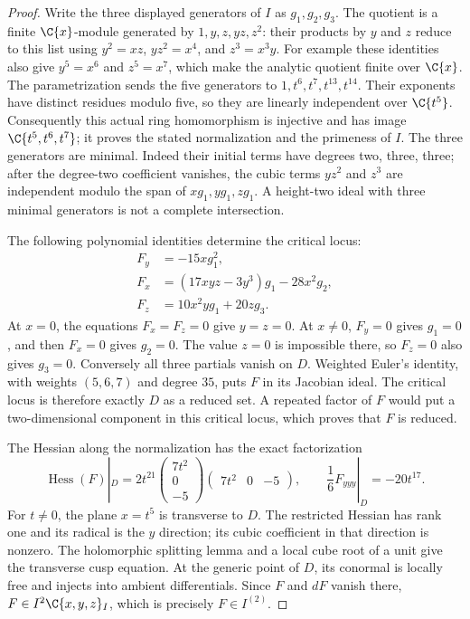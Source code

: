 \begin{proof}
Write the three displayed generators of $I$ as $g_1,g_2,g_3$.
The quotient is a finite $\C\{x\}$-module generated by
$1,y,z,yz,z^2$: their products by $y$ and $z$ reduce to this list
using $y^2=xz$, $yz^2=x^4$, and $z^3=x^3y$.
For example these identities also give $y^5=x^6$ and $z^5=x^7$,
which make the analytic quotient finite over $\C\{x\}$.
The parametrization sends the five generators to
$1,t^6,t^7,t^{13},t^{14}$. Their exponents have distinct residues
modulo five, so they are linearly independent over $\C\{t^5\}$.
Consequently this actual ring homomorphism is injective and has
image $\C\{t^5,t^6,t^7\}$; it proves the stated normalization and
the primeness of $I$. The three generators are minimal. Indeed their
initial terms have degrees two, three, three; after the degree-two
coefficient vanishes, the cubic terms $yz^2$ and $z^3$ are independent
modulo the span of $xg_1,yg_1,zg_1$. A height-two ideal with three
minimal generators is not a complete intersection.

The following polynomial identities determine the critical locus:
\[
 \begin{aligned}
 F_y&=-15xg_1^2,\\
 F_x&=(17xyz-3y^3)g_1-28x^2g_2,\\
 F_z&=10x^2yg_1+20zg_3.
 \end{aligned}                                                   \tag{A.NL.3}
\]
At $x=0$, the equations $F_x=F_z=0$ give $y=z=0$.
At $x\ne0$, $F_y=0$ gives $g_1=0$, and then $F_x=0$
gives $g_2=0$. The value $z=0$ is impossible there, so $F_z=0$
also gives $g_3=0$. Conversely all three partials vanish on $D$.
Weighted Euler's identity, with weights $(5,6,7)$ and degree $35$,
puts $F$ in its Jacobian ideal. The critical locus is therefore
exactly $D$ as a reduced set. A repeated factor of $F$ would put
a two-dimensional component in this critical locus, which proves
that $F$ is reduced.

The Hessian along the normalization has the exact factorization
\[
 \operatorname{Hess}(F)|_D
 =2t^{21}
 \begin{pmatrix}7t^2\\0\\-5\end{pmatrix}
 \begin{pmatrix}7t^2&0&-5\end{pmatrix},
 \qquad \frac{1}{6}F_{yyy}|_D=-20t^{17}.                       \tag{A.NL.4}
\]
For $t\ne0$, the plane $x=t^5$ is transverse to $D$.
The restricted Hessian has rank one and its radical is the
$y$ direction; its cubic coefficient in that direction is nonzero.
The holomorphic splitting lemma and a local cube root of a unit
give the transverse cusp equation. At the generic point of $D$,
its conormal is locally free and injects into ambient differentials.
Since $F$ and $dF$ vanish there, $F\in I^2\C\{x,y,z\}_I$,
which is precisely $F\in I^{(2)}$.


\end{proof}
